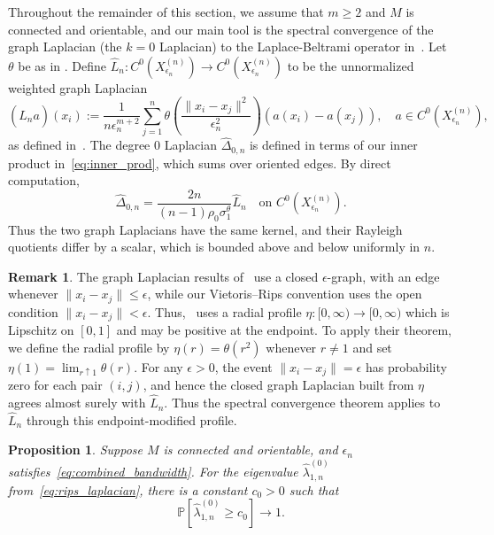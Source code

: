 \documentclass[11pt,reqno]{amsproc}
\numberwithin{equation}{section}
\newcommand{\PP}{\mathbb{P}}
\newtheorem{proposition}[counter]{Proposition}
\theoremstyle{definition}
\newtheorem{remark}[counter]{Remark}
\theoremstyle{plain}
\begin{document}
    Throughout the remainder of this section, we assume that $m\geq2$ and $M$ is connected and orientable, and our main tool is the spectral convergence of the graph Laplacian (the $k=0$ Laplacian) to the Laplace-Beltrami operator in~\cite{calder_improved_2022}.
    Let $\theta$ be as in .  
    Define $\hat{L}_n:C^0(X^{(n)}_{\epsilon_n})\to C^0(X^{(n)}_{\epsilon_n})$ to be the unnormalized weighted graph Laplacian
    \begin{equation} \label{eq:graph_laplacian_sec7}
        (\hat{L}_n a)(x_i)
        :=
        \frac{1}{n\epsilon_n^{m+2}}
        \sum_{j=1}^n
        \theta\left(\frac{\|x_i-x_j\|^2}{\epsilon_n^2}\right)
        (a(x_i)-a(x_j)), \quad a \in C^0(X^{(n)}_{\epsilon_n}),
    \end{equation}
    as defined in~\cite[Equation 2.3]{calder_improved_2022}. The degree $0$ Laplacian $\hat{\Delta}_{0,n}$ is defined in terms of our inner product in~\eqref{eq:inner_prod}, which sums over oriented edges. By direct computation, 
    \begin{equation} \label{eq:laplacian_operator_identity}
        \widehat\Delta_{0,n}
        =
        \frac{2n}{(n-1)\rho_0\sigma_1^\theta}
        \hat{L}_n
        \quad\text{on } C^0(X^{(n)}_{\epsilon_n}).
    \end{equation}
    Thus the two graph Laplacians have the same kernel, and their Rayleigh quotients differ by a scalar, which is bounded above and below uniformly in $n$.

    \begin{remark} \label{rem:open_closed_graph_sec7}
    The graph Laplacian results of~\cite{calder_improved_2022} use a closed $\epsilon$-graph, with an edge whenever $\|x_i-x_j\|\leq \epsilon$, while our Vietoris--Rips convention uses the open condition $\|x_i-x_j\|<\epsilon$. Thus,~\cite{calder_improved_2022} uses a radial profile $\eta: [0, \infty) \to [0,\infty)$ which is Lipschitz on $[0,1]$ and may be positive at the endpoint. To apply their theorem, we define the radial profile by $\eta(r) = \theta(r^2)$ whenever $r \neq 1$ and set $\eta(1) = \lim_{r\uparrow 1}\theta(r)$. For any $\epsilon > 0$, the event $\|x_i-x_j\|=\epsilon$ has probability zero for each pair $(i,j)$, and hence the closed graph Laplacian built from $\eta$ agrees almost surely with $\hat{L}_n$. Thus the spectral convergence theorem applies to $\hat{L}_n$ through this endpoint-modified profile.
    \end{remark}

    \begin{proposition} \label{prop:degree_zero_gap_sec7}
    Suppose $M$ is connected and orientable, and $\epsilon_n$ satisfies~\eqref{eq:combined_bandwidth}.  For the eigenvalue  $\widehat\lambda^{(0)}_{1,n}$ from~\eqref{eq:rips_laplacian}, there is a constant $c_0>0$ such that
    \[
        \PP\left[\widehat\lambda^{(0)}_{1,n}\geq c_0\right]\to 1.
    \]
    \end{proposition}
\end{document}
